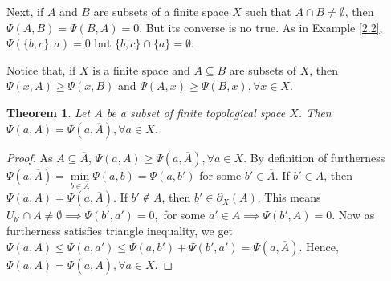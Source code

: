 \documentclass[12pt]{amsart}
\newtheorem{theorem}[definition]{Theorem}
\begin{document}
	Next, if $A$ and $B$ are subsets of a finite space $X$ such that $A\cap B\neq \emptyset$, then $\Psi(A,B)=\Psi(B,A)=0$. But its converse is no true. As in Example \ref{2.2}, $\Psi(\{b,c\},a)=0$ but $\{b,c\}\cap \{a\}= \emptyset$.
	
	
	Notice that, if  $X$ is a finite space and $A\subseteq B$ are subsets of $X$, then $\Psi(x,A)\geq \Psi(x,B)$ and $\Psi(A,x)\geq \Psi(B,x), \forall x\in X$.
	
	\begin{theorem}
	Let $A$ be a subset of finite topological space $X$. Then $\Psi(a,A)=\Psi(a,\overline{A}),\forall a\in X$.
	\end{theorem}
	\begin{proof}
	As $A\subseteq \overline{A}$,  $\Psi(a,A)\geq \Psi(a,\overline{A}),\forall a\in X$. By definition of furtherness $\Psi(a,\overline{A})=\min\limits_{b\in\overline{A}}\Psi(a,b)=\Psi(a,b')$ for some $b'\in\overline{A}$. If $b'\in A$, then $\Psi(a,A)=\Psi(a,\overline{A})$. If $b'\notin A$, then $b'\in \partial_{X}(A)$. This means $U_{b'}\cap A\neq\emptyset\implies \Psi(b',a')=0,$ for some $a'\in A \implies \Psi(b',A)=0$. Now as furtherness satisfies triangle inequality, we get $\Psi(a,A)\leq \Psi(a,a')\leq \Psi(a,b')+\Psi(b',a')= \Psi(a,\overline{A}).$ Hence, $\Psi(a,A)=\Psi(a,\overline{A}),\forall a\in X$.
	\end{proof}
	
	
	
	
	
\end{document}
